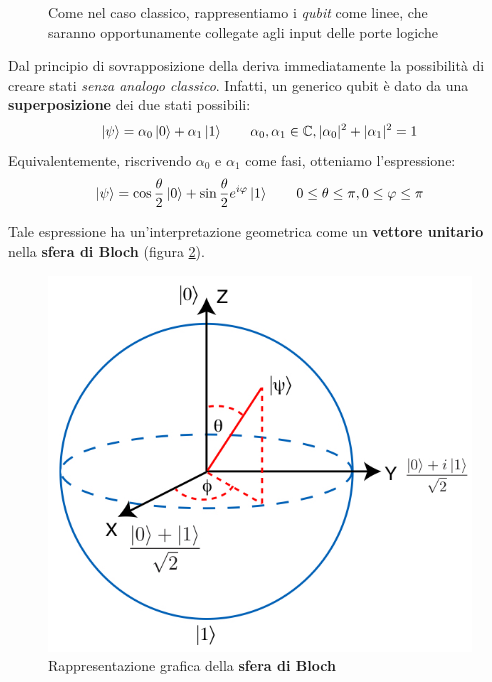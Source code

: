 \documentclass[../../InformazioneQuantistica.tex]{subfiles}
\begin{document}
\begin{figure}[H]
\centering

\caption{Come nel caso classico, rappresentiamo i \textit{qubit} come linee, che saranno opportunamente collegate agli input delle porte logiche\label{fig:qubit-righe}}
\end{figure}

Dal principio di sovrapposizione della \MQ deriva immediatamente la possibilità di creare stati \textit{senza analogo classico}. Infatti, un generico qubit è dato da una \textbf{superposizione} dei due stati possibili:
\begin{align*}
\Ket{\psi} = \alpha_0 \Ket{0} + \alpha_1 \Ket{1} \qquad \alpha_0, \alpha_1 \in \mathbb{C}, |\alpha_0|^2 + |\alpha_1|^2 = 1
\end{align*}
Equivalentemente, riscrivendo $\alpha_0$ e $\alpha_1$ come fasi, otteniamo l'espressione:
\begin{align*}
\Ket{\psi} = \cos\frac{\theta}{2} \Ket{0} + \sin\frac{\theta}{2} e^{i\varphi} \Ket{1} \qquad 0\leq \theta \leq \pi, 0 \leq \varphi \leq \pi
\end{align*}

Tale espressione ha un'interpretazione geometrica come un \textbf{vettore unitario} nella \textbf{sfera di Bloch} (figura \ref{fig:blochsphere}).

\begin{figure}[H]
\centering
\includegraphics[scale=0.4]{Immagini/27_2/image002.png}
\caption{Rappresentazione grafica della \textbf{sfera di Bloch}\label{fig:blochsphere}}
\end{figure}
\end{document}

